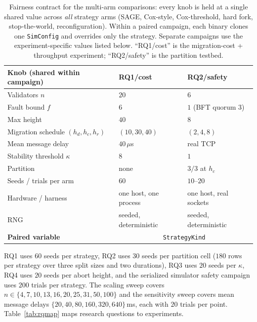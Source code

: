 \documentclass[journal]{IEEEtran}
\theoremstyle{definition}
\theoremstyle{remark}
\begin{document}
\begin{table}[t]
\centering
\caption{Fairness contract for the multi-arm comparisons: every knob is held at a single shared
value across \emph{all} strategy arms (SAGE, Cox-style, Cox-threshold, hard fork, stop-the-world,
reconfiguration). Within a paired campaign, each binary clones one \texttt{SimConfig} and overrides only the strategy. Separate campaigns use the experiment-specific values listed below. ``RQ1/cost'' is the migration-cost + throughput experiment;
``RQ2/safety'' is the partition testbed.}
\label{tab:fairness}
\setlength{\tabcolsep}{5pt}
\renewcommand{\arraystretch}{1.15}
\footnotesize
\begin{tabular}{p{}p{}p{}}
\toprule
Knob (shared within campaign) & RQ1/cost & RQ2/safety \\
\midrule
Validators $n$                & $20$          & $6$ \\
Fault bound $f$               & $6$           & $1$ (BFT quorum $3$) \\
Max height                    & $40$          & $8$ \\
Migration schedule $(h_d,h_c,h_r)$ & $(10,30,40)$ & $(2,4,8)$ \\
Mean message delay            & $40\,\mu$s    & real TCP \\
Stability threshold $\kappa$  & $8$           & $1$ \\
Partition                     & none          & $3/3$ at $h_c$ \\
Seeds / trials per arm        & $60$          & $10$--$20$ \\
Hardware / harness            & one host, one process & one host, real sockets \\
RNG                           & seeded, deterministic & seeded, deterministic \\
\midrule
\textbf{Paired variable} & \multicolumn{2}{c}{\texttt{StrategyKind}} \\
\bottomrule
\end{tabular}
\end{table}
RQ1 uses $60$ seeds per strategy, RQ2 uses $30$ seeds per partition cell ($180$ rows per strategy
over three split sizes and two durations), RQ3 uses $20$ seeds per $\kappa$, RQ4 uses $20$ seeds
per abort height, and the serialized simulator safety campaign uses $200$ trials per strategy. The scaling
sweep covers $n\in\{4,7,10,13,16,20,25,31,50,100\}$ and the sensitivity sweep covers mean message delays
$\{20,40,80,160,320,640\}\,$ms, each with $20$ trials per point. Table~\ref{tab:rqmap} maps research
questions to experiments.
\end{document}

